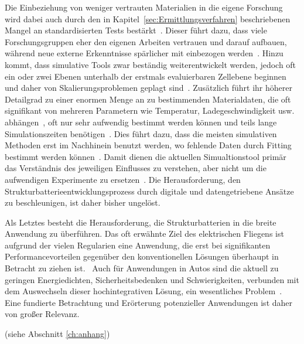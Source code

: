 Die Einbeziehung von weniger vertrauten Materialien in die eigene Forschung wird dabei auch durch den in Kapitel~\ref{sec:Ermittlungsverfahren} beschriebenen Mangel an standardisierten Tests bestärkt~\cite{Greenhalgh2024a}. Dieser führt dazu, dass viele Forschungsgruppen eher den eigenen Arbeiten vertrauen und darauf aufbauen, während neue externe Erkenntnisse spärlicher mit einbezogen werden~\cite{Greenhalgh2023, Greenhalgh2024a}. Hinzu kommt, dass simulative Tools zwar beständig weiterentwickelt werden, jedoch oft ein oder zwei Ebenen unterhalb der erstmals evaluierbaren Zellebene beginnen und daher von Skalierungsproblemen geplagt sind~\cite{Franco2019,Giessen2020}. Zusätzlich führt ihr höherer Detailgrad zu einer enormen Menge an zu bestimmenden Materialdaten, die oft signifikant von mehreren Parametern wie Temperatur, Ladegeschwindigkeit usw. abhängen~\cite{Duan2021,Carlstedt2022b}, oft nur sehr aufwendig bestimmt werden können und teils lange Simulationszeiten benötigen~\cite{Franco2019,Carlstedt2022}. Dies führt dazu, dass die meisten simulativen Methoden erst im Nachhinein benutzt werden, wo fehlende Daten durch Fitting bestimmt werden können~\cite{Carlstedt2022a, Carlstedt2023}. Damit dienen die aktuellen Simualtionstool primär das Verständnis des jeweiligen Einflusses zu verstehen, aber nicht um die aufwendigen Experimente zu ersetzen~\cite{Franco2013}. Die Herausforderung, den Strukturbatterieentwicklungsprozess durch digitale und datengetriebene Ansätze zu beschleunigen, ist daher bisher ungelöst.

Als Letztes besteht die Herausforderung, die Strukturbatterien in die breite Anwendung zu überführen. Das oft erwähnte Ziel des elektrischen Fliegens ist aufgrund der vielen Regularien eine Anwendung, die erst bei signifikanten Performancevorteilen gegenüber den konventionellen Lösungen überhaupt in Betracht zu ziehen ist.~\cite{Scholz2018,Schaefer2018,Ishfaq2022} Auch für Anwendungen in Autos sind die aktuell zu geringen Energiedichten, Sicherheitsbedenken und Schwierigkeiten, verbunden mit dem Auswechseln dieser hochintegrativen Lösung, ein wesentliches Problem~\cite{Kalnaus2021,Martins2021, Carlstedt2020a}. Eine fundierte Betrachtung und Erörterung potenzieller Anwendungen ist daher von großer Relevanz.

(siehe Abschnitt \ref{ch:anhang})
